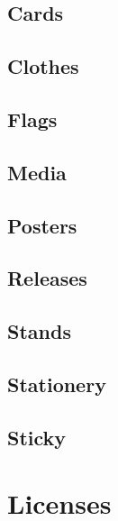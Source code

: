 \documentclass[12pt]{book}
\begin{document}
\chapter{Cards}
   \hypertarget{cha:Promotion:Cards}{}
   \label{cha:Promotion:Cards}

\chapter{Clothes}
   \hypertarget{cha:Promotion:Clothes}{}
   \label{cha:Promotion:Clothes}

\chapter{Flags}
   \hypertarget{cha:Promotion:Flags}{}
   \label{cha:Promotion:Flags}

\chapter{Media}
   \hypertarget{cha:Promotion:Media}{}
   \label{cha:Promotion:Media}

\chapter{Posters}
   \hypertarget{cha:Promotion:Posters}{}
   \label{cha:Promotion:Posters}
   
\chapter{Releases}
   \hypertarget{cha:Promotion:Releases}{}
   \label{cha:Promotion:Releases}

\chapter{Stands}
   \hypertarget{cha:Promotion:Stands}{}
   \label{cha:Promotion:Stands}

\chapter{Stationery}
   \hypertarget{cha:Promotion:Stationery}{}
   \label{cha:Promotion:Stationery}

\chapter{Sticky}
   \hypertarget{cha:Promotion:Sticky}{}
   \label{cha:Promotion:Sticky}

\part{Licenses}
\appendix



\backmatter


\end{document}
